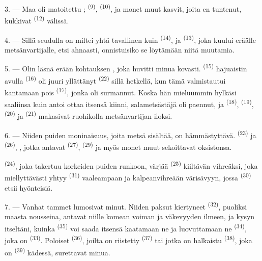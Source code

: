 3. --- Maa oli matoitettu ; 
\textsuperscript{(9)},  \textsuperscript{(10)}, ja monet muut
kasvit, joita en tuntenut, kukkivat 
\textsuperscript{(12)} välissä.

4. --- Sillä seudulla  on miltei yhtä tavallinen kuin
 \textsuperscript{(14)}, ja 
\textsuperscript{(13)}, joka kuului eräälle metsänvartijalle, etsi ahnaasti,
onnistuisiko se löytämään niitä muutamia.

\VUsaut{3.0mm}
\VUsaut{3.0mm}

5. --- Olin läsnä erään kohtauksen , joka huvitti minua kovasti.
 \textsuperscript{(15)} hajuaistin avulla
 \textsuperscript{(16)} oli juuri yllättänyt
 \textsuperscript{(22)} sillä hetkellä, kun tämä
valmistautui kantamaan pois  \textsuperscript{(17)}, jonka oli
surmannut. Koska hän mieluummin hylkäsi saaliinsa kuin antoi ottaa itsensä
kiinni, salametsästäjä oli paennut, ja  \textsuperscript{(18)},
 \textsuperscript{(19)}, 
\textsuperscript{(20)} ja  \textsuperscript{(21)} makasivat
ruohikolla metsänvartijan iloksi.

6. --- Niiden puiden moninaisuus, joita metsä sisältää, on hämmästyttävä.
 \textsuperscript{(23)} ja 
\textsuperscript{(26)}, , jotka antavat 
\textsuperscript{(27)},  \textsuperscript{(29)} ja myös monet
muut sekoittavat oksistonsa.

 \textsuperscript{(24)}, joka takertuu korkeiden puiden runkoon,
värjää  \textsuperscript{(25)} kiiltävän vihreäksi, joka
miellyttävästi yhtyy  \textsuperscript{(31)} vaaleampaan ja
kalpeanvihreään värisävyyn, jossa 
\textsuperscript{(30)} etsii hyönteisiä.

\VUsaut{3.0mm}
\VUsaut{3.0mm}

7. --- Vanhat tammet lumosivat minut. Niiden paksut kiertyneet 
\textsuperscript{(32)}, puoliksi maasta nousseina, antavat niille komean voiman
ja väkevyyden ilmeen, ja kysyn itseltäni, kuinka 
\textsuperscript{(35)} voi saada itsensä kaatamaan ne ja luovuttamaan ne
 \textsuperscript{(34)}, joka on 
\textsuperscript{(33)}. Poloiset  \textsuperscript{(36)}, joilta
on riistetty  \textsuperscript{(37)} tai jotka on halkaistu
 \textsuperscript{(38)}, joka on 
\textsuperscript{(39)} kädessä, surettavat minua.

